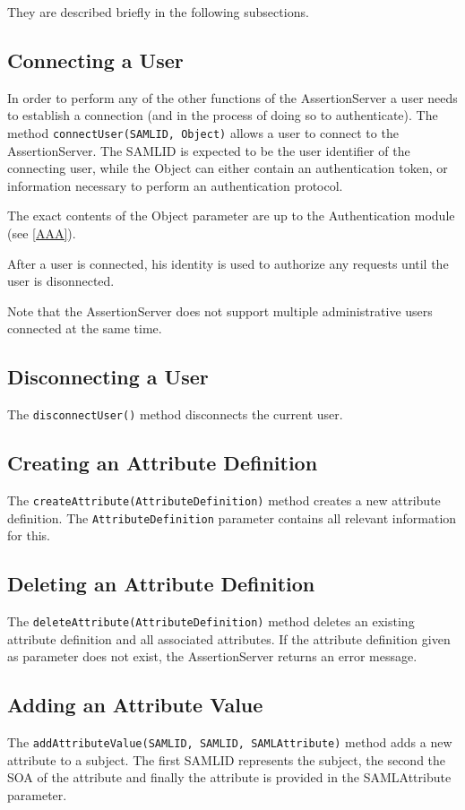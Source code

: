 \documentclass[10pt,a4paper]{article}
\begin{document}
They are described briefly in the following subsections.


\subsection{Connecting a User }
In order to perform any of the other functions of the AssertionServer
a user needs to establish a connection (and in the process of doing so
to authenticate). The method \texttt{connectUser(SAMLID, Object)}
allows a user to connect to the AssertionServer. The SAMLID is expected to
be the user identifier of the connecting user, while the Object can either
contain an authentication token, or information necessary to perform an
authentication protocol. 

The exact contents of the Object parameter are up to the Authentication module
(see \ref{AAA}).

After a user is connected, his identity is used to authorize any requests
until the user is disonnected.

Note that the AssertionServer does not support multiple administrative users
connected at the same time.

\subsection{Disconnecting a User}
The \texttt{disconnectUser()} method disconnects the current user.

\subsection{Creating an Attribute Definition}
The \texttt{createAttribute(AttributeDefinition)} method creates a new 
attribute definition. The \texttt{AttributeDefinition} parameter contains all
relevant information for this.


\subsection{Deleting an Attribute Definition}
The \texttt{deleteAttribute(AttributeDefinition)} method deletes an existing
attribute definition and all associated attributes. If the attribute definition
given as parameter does not exist, the AssertionServer returns an error 
message.

\subsection{Adding an Attribute Value}
The \texttt{addAttributeValue(SAMLID, SAMLID, SAMLAttribute)} method adds
a new attribute to a subject. The first SAMLID represents the subject,
the second the SOA of the attribute and finally the attribute is provided in
the SAMLAttribute parameter.
\end{document}
